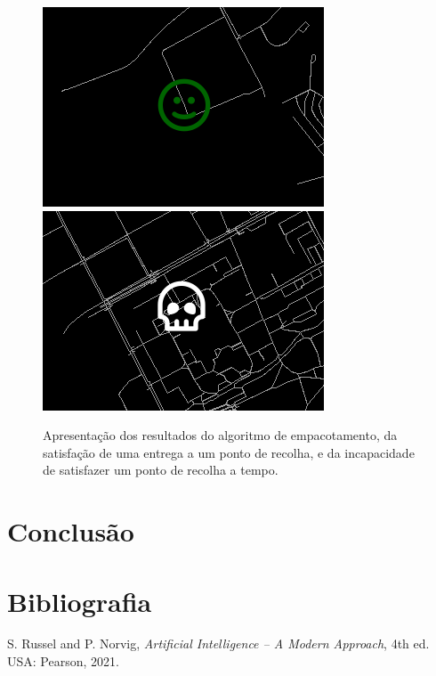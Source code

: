 \documentclass[12pt, a4paper, titlepage]{article}
\begin{document}
\begin{figure}[H]
\begin{minipage}{0.32\textwidth}
    \end{minipage}
    \begin{minipage}{0.45\textwidth}
        \includegraphics[width=\textwidth]{res/Sucesso.png}
        \includegraphics[width=\textwidth]{res/Morte.png}
    \end{minipage}
    \caption{
        Apresentação dos resultados do algoritmo de empacotamento, da satisfação de uma entrega a um
        ponto de recolha, e da incapacidade de satisfazer um ponto de recolha a tempo.
    }
\end{figure}
\section{Conclusão}

\section{Bibliografia}
\def\refname{}
\vspace{-1.5cm}
\begin{thebibliography}{9}
     S. Russel and P. Norvig, \emph{Artificial Intelligence -- A Modern Approach},
        4th ed. USA: Pearson, 2021.
\end{thebibliography}
\end{document}

